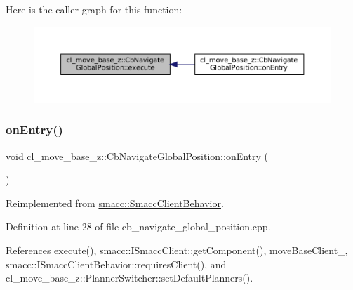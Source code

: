 Here is the caller graph for this function\+:
\nopagebreak
\begin{figure}[H]
\begin{center}
\leavevmode
\includegraphics[width=350pt]{classcl__move__base__z_1_1CbNavigateGlobalPosition_a0b8525ea9e4388b27cb1f9b1e06a3b63_icgraph}
\end{center}
\end{figure}
\mbox{\label{classcl__move__base__z_1_1CbNavigateGlobalPosition_a66d8b0555ef2945bc108dcd5171be292}} 
\subsubsection{\texorpdfstring{on\+Entry()}{onEntry()}}
{\footnotesize\ttfamily void cl\+\_\+move\+\_\+base\+\_\+z\+::\+Cb\+Navigate\+Global\+Position\+::on\+Entry (\begin{DoxyParamCaption}{ }\end{DoxyParamCaption})\hspace{0.3cm}{\ttfamily [virtual]}}



Reimplemented from \hyperlink{classsmacc_1_1SmaccClientBehavior_ad5d3e1f1697c3cfe66c94cadba948493}{smacc\+::\+Smacc\+Client\+Behavior}.



Definition at line 28 of file cb\+\_\+navigate\+\_\+global\+\_\+position.\+cpp.



References execute(), smacc\+::\+I\+Smacc\+Client\+::get\+Component(), move\+Base\+Client\+\_\+, smacc\+::\+I\+Smacc\+Client\+Behavior\+::requires\+Client(), and cl\+\_\+move\+\_\+base\+\_\+z\+::\+Planner\+Switcher\+::set\+Default\+Planners().


